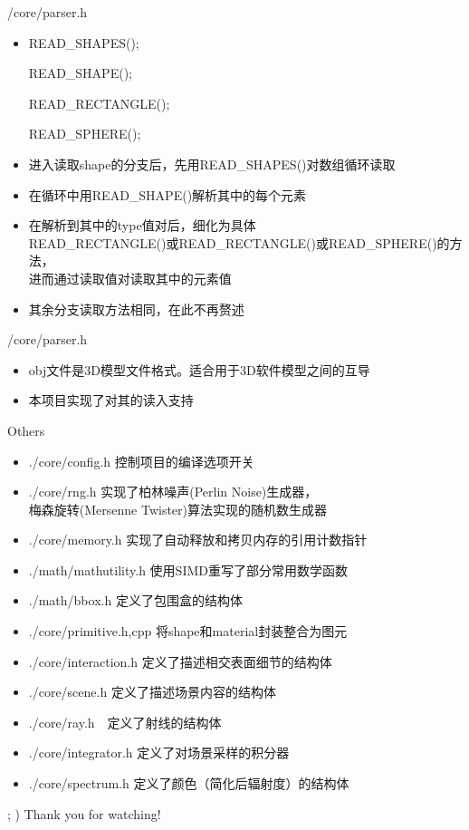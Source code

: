 \documentclass{beamer}
\begin{document}
\begin{frame} {/core/parser.h}
\begin{itemize}
\item \begin{semiverbatim}  READ\_SHAPES(); \end{semiverbatim}
\begin{semiverbatim} READ\_SHAPE(); \end{semiverbatim}
\begin{semiverbatim} READ\_RECTANGLE(); \end{semiverbatim}
\begin{semiverbatim} READ\_SPHERE(); \end{semiverbatim}
\item 进入读取shape的分支后，先用READ\_SHAPES()对数组循环读取
\item 在循环中用READ\_SHAPE()解析其中的每个元素
\item 在解析到其中的type值对后，细化为具体 \\ READ\_RECTANGLE()或READ\_RECTANGLE()或READ\_SPHERE()的方法， \\ 进而通过读取值对读取其中的元素值
\item 其余分支读取方法相同，在此不再赘述
\end{itemize}
\end{frame}

\begin{frame} {/core/parser.h}
\begin{itemize}
\item obj文件是3D模型文件格式。适合用于3D软件模型之间的互导
\item 本项目实现了对其的读入支持
\end{itemize}
\end{frame}

\begin{frame} {Others}
\begin{itemize}

\item ./core/config.h 控制项目的编译选项开关
\item ./core/rng.h 实现了柏林噪声(Perlin Noise)生成器，\\ 梅森旋转(Mersenne Twister)算法实现的随机数生成器
\item ./core/memory.h 实现了自动释放和拷贝内存的引用计数指针
\item ./math/mathutility.h 使用SIMD重写了部分常用数学函数
\item ./math/bbox.h 定义了包围盒的结构体
\item ./core/primitive.h,cpp 将shape和material封装整合为图元
\item ./core/interaction.h 定义了描述相交表面细节的结构体
\item ./core/scene.h 定义了描述场景内容的结构体
\item ./core/ray.h　定义了射线的结构体
\item ./core/integrator.h 定义了对场景采样的积分器
\item ./core/spectrum.h 定义了颜色（简化后辐射度）的结构体
\end{itemize}
\end{frame}

\begin{frame} {; )}
Thank you for watching!
\end{frame}
\end{document}
